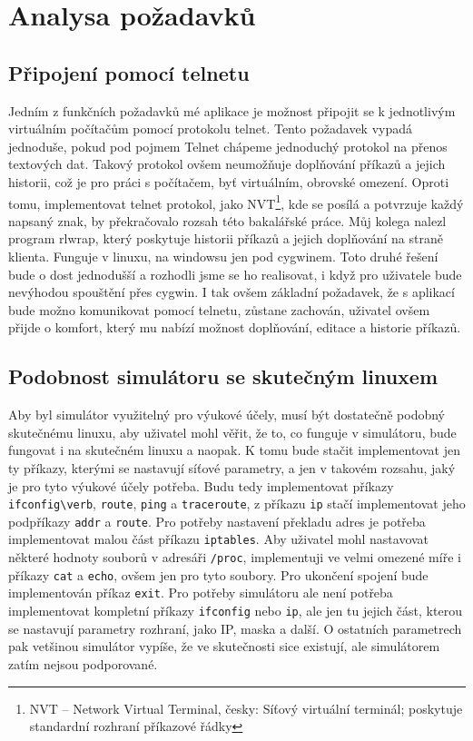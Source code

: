 
\section{Analysa požadavků}


\subsection{Připojení pomocí telnetu}

Jedním z funkčních požadavků mé aplikace je možnost připojit se k jednotlivým virtuálním počítačům pomocí protokolu telnet. Tento požadavek vypadá jednoduše, pokud pod pojmem Telnet chápeme jednoduchý protokol na přenos textových dat. Takový protokol ovšem neumožňuje doplňování příkazů a jejich historii, což je pro práci s počítačem, byť virtuálním, obrovské omezení. Oproti tomu, implementovat telnet protokol, jako NVT\footnote{NVT – Network Virtual Terminal, česky: Síťový virtuální terminál; poskytuje standardní rozhraní příkazové řádky}, kde se posílá a potvrzuje každý napsaný znak, by překračovalo rozsah této bakalářské práce. Můj kolega nalezl program rlwrap, který poskytuje historii příkazů a jejich doplňování na straně klienta. Funguje v linuxu, na windowsu jen pod cygwinem. Toto druhé řešení bude o dost jednodušší a rozhodli jsme se ho realisovat, i když pro uživatele bude nevýhodou spouštění přes cygwin. I tak ovšem základní požadavek, že s aplikací bude možno komunikovat pomocí telnetu, zůstane zachován, uživatel ovšem přijde o komfort, který mu nabízí možnost doplňování, editace a historie příkazů. 


\subsection{Podobnost simulátoru se skutečným linuxem}

Aby byl simulátor využitelný pro výukové účely, musí být dostatečně podobný skutečnému linuxu, aby uživatel mohl věřit, že to, co funguje v simulátoru, bude fungovat i na skutečném linuxu a naopak. K tomu bude stačit implementovat jen ty příkazy, kterými se nastavují síťové parametry, a jen v takovém rozsahu, jaký je pro tyto výukové účely potřeba. Budu tedy implementovat příkazy \verb|ifconfig\verb|, \verb|route|, \verb|ping| a \verb|traceroute|, z příkazu \verb|ip| stačí implementovat jeho podpříkazy \verb|addr| a \verb|route|. Pro potřeby nastavení překladu adres je potřeba implementovat malou část příkazu \verb|iptables|. Aby uživatel mohl nastavovat některé hodnoty souborů v adresáři \verb|/proc|, implementuji ve velmi omezené míře i příkazy \verb|cat| a \verb|echo|, ovšem jen pro tyto soubory. Pro ukončení spojení bude implementován příkaz \verb|exit|. Pro potřeby simulátoru ale není potřeba implementovat kompletní příkazy \verb|ifconfig| nebo \verb|ip|, ale jen tu jejich část, kterou se nastavují parametry rozhraní, jako IP, maska a další. O ostatních parametrech pak vetšinou simulátor vypíše, že ve skutečnosti sice existují, ale simulátorem zatím nejsou podporované.


